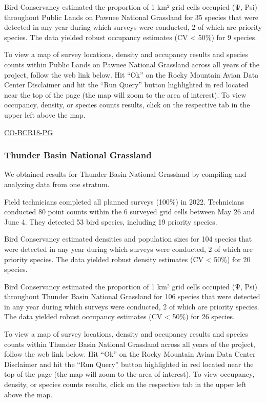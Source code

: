 \documentclass[
  letterpaper,
  DIV=11,
  numbers=noendperiod,
  oneside]{scrreprt}
\begin{document}
Bird Conservancy estimated the proportion of 1 km² grid cells occupied
(Ψ, Psi) throughout Public Lands on Pawnee National Grassland for 35
species that were detected in any year during which surveys were
conducted, 2 of which are priority species. The data yielded robust
occupancy estimates (CV \textless{} 50\%) for 9 species.

To view a map of survey locations, density and occupancy results and
species counts within Public Lands on Pawnee National Grassland across
all years of the project, follow the web link below. Hit ``Ok'' on the
Rocky Mountain Avian Data Center Disclaimer and hit the ``Run Query''
button highlighted in red located near the top of the page (the map will
zoom to the area of interest). To view occupancy, density, or species
counts results, click on the respective tab in the upper left above the
map.

\href{http://www.rmbo.org/new_site/adc/QueryWindow.aspx\#N4IgzgLgTghhCuBbEAuABCAwgeQLQCFMAlARgA5cAFAcXUpgHcA7AUxbQDk4BLAeyZgAbNNVhgwgmEwAmaXGkrwARoO4BjNABkp0sCAC+QA=}{CO-BCR18-PG}

\hypertarget{thunder-basin-national-grassland}{%
\subsubsection{Thunder Basin National
Grassland}\label{thunder-basin-national-grassland}}

We obtained results for Thunder Basin National Grassland by compiling
and analyzing data from one stratum.

Field technicians completed all planned surveys (100\%) in 2022.
Technicians conducted 80 point counts within the 6 surveyed grid cells
between May 26 and June 4. They detected 53 bird species, including 19
priority species.

Bird Conservancy estimated densities and population sizes for 104
species that were detected in any year during which surveys were
conducted, 2 of which are priority species. The data yielded robust
density estimates (CV \textless{} 50\%) for 20 species.

Bird Conservancy estimated the proportion of 1 km² grid cells occupied
(Ψ, Psi) throughout Thunder Basin National Grassland for 106 species
that were detected in any year during which surveys were conducted, 2 of
which are priority species. The data yielded robust occupancy estimates
(CV \textless{} 50\%) for 26 species.

To view a map of survey locations, density and occupancy results and
species counts within Thunder Basin National Grassland across all years
of the project, follow the web link below. Hit ``Ok'' on the Rocky
Mountain Avian Data Center Disclaimer and hit the ``Run Query'' button
highlighted in red located near the top of the page (the map will zoom
to the area of interest). To view occupancy, density, or species counts
results, click on the respective tab in the upper left above the map.
\end{document}
